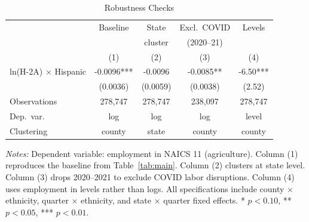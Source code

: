 \begin{table}[htbp]
\centering
\caption{Robustness Checks}
\label{tab:robust}
\small
\begin{tabular}{lcccc}
\hline\hline
 & Baseline & State & Excl.\ COVID & Levels \\
 & & cluster & (2020--21) & \\
 & (1) & (2) & (3) & (4) \\
\hline
ln(H-2A) $\times$ Hispanic & -0.0096*** & -0.0096 & -0.0085** & -6.50*** \\
 & (0.0036) & (0.0059) & (0.0038) & (2.52) \\
Observations & 278,747 & 278,747 & 238,097 & 278,747 \\
Dep.\ var.\ & log & log & log & level \\
Clustering & county & state & county & county \\
\hline\hline
\end{tabular}
\begin{tablenotes}
\item \textit{Notes:} Dependent variable: employment in NAICS 11 (agriculture). Column (1) reproduces the baseline from Table~\ref{tab:main}. Column (2) clusters at state level. Column (3) drops 2020--2021 to exclude COVID labor disruptions. Column (4) uses employment in levels rather than logs. All specifications include county $\times$ ethnicity, quarter $\times$ ethnicity, and state $\times$ quarter fixed effects. * $p<0.10$, ** $p<0.05$, *** $p<0.01$.
\end{tablenotes}
\end{table}

